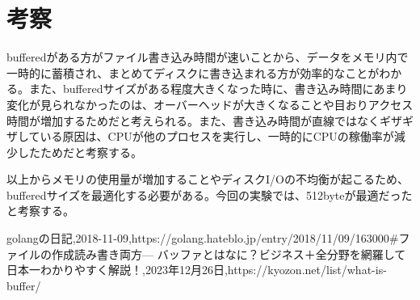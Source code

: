 \documentclass[a4paper, 11pt, titlepage]{jsarticle}
\begin{document}
\section{考察}
bufferedがある方がファイル書き込み時間が速いことから、データをメモリ内で一時的に蓄積され、まとめてディスクに書き込まれる方が効率的なことがわかる。また、bufferedサイズがある程度大きくなった時に、書き込み時間にあまり変化が見られなかったのは、オーバーヘッドが大きくなることや目おりアクセス時間が増加するためだと考えられる。また、書き込み時間が直線ではなくギザギザしている原因は、CPUが他のプロセスを実行し、一時的にCPUの稼働率が減少したためだと考察する。

以上からメモリの使用量が増加することやディスクI/Oの不均衡が起こるため、bufferedサイズを最適化する必要がある。今回の実験では、512byteが最適だったと考察する。

\clearpage

\begin{thebibliography}{99}
 golangの日記,2018-11-09,https://golang.hateblo.jp/entry/2018/11/09/163000\#ファイルの作成読み書き両方---
バッファとはなに？ビジネス＋全分野を網羅して日本一わかりやすく解説！,2023年12月26日,https://kyozon.net/list/what-is-buffer/
\end{thebibliography}
\end{document}
